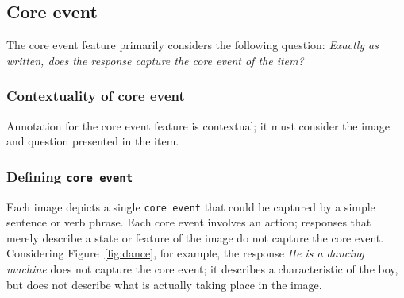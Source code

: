 \documentclass[12pt,notitlepage]{article}
\newcommand{\feat}[1]{\texttt{#1}}
\begin{document}
\subsection{Core event} \label{subsec:core-event}
The core event feature primarily considers the following question: \textit{Exactly as written, does the response capture the core event of the item?}

\subsubsection{Contextuality of core event} Annotation for the core event feature is contextual; it must consider the image and question presented in the item. 

\subsubsection{Defining \feat{core event}}
Each image depicts a single \feat{core event} that could be captured by a simple sentence or verb phrase. Each core event involves an action; responses that merely describe a state or feature of the image do not capture the core event. Considering Figure~\ref{fig:dance}, for example, the response \textit{He is a dancing machine} does not capture the core event; it describes a characteristic of the boy, but does not describe what is actually taking place in the image.
\end{document}
